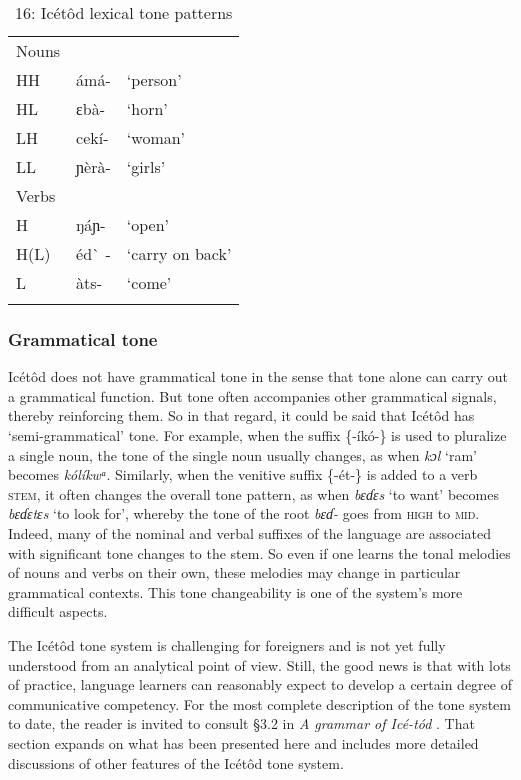 \begin{table}
\caption{16: Icétôd lexical tone patterns}
\label{tab:2}


\begin{tabularx}{\textwidth}{XXX}
\lsptoprule

Nouns &  & \\
HH & ámá- & ‘person’\\
HL & ɛbà- & ‘horn’\\
LH & cekí- & ‘woman’\\
LL & ɲèrà- & ‘girls’\\
Verbs &  & \\
H & ŋáɲ- & ‘open’\\
H(L) & éd\`{} - & ‘carry on back’\\
L & àts- & ‘come’\\
\lspbottomrule
\end{tabularx}
\end{table}

\subsubsection{Grammatical tone}

Icétôd does not have grammatical tone in the sense that tone alone can carry out a grammatical function. But tone often accompanies other grammatical signals, thereby reinforcing them. So in that regard, it could be said that Icétôd has ‘semi-grammatical’ tone. For example, when the suffix \{-íkó-\} is used to pluralize a single noun, the tone of the single noun usually changes, as when \textit{kɔl} ‘ram’ becomes \textit{kólíkwᵃ}. Similarly, when the venitive suffix \{-ét-\} is added to a verb \textsc{stem}, it often changes the overall tone pattern, as when \textit{bɛɗɛs} ‘to want’ becomes \textit{bɛɗɛtɛs} ‘to look for’, whereby the tone of the root \textit{bɛɗ-} goes from \textsc{high} to \textsc{mid}. Indeed, many of the nominal and verbal suffixes of the language are associated with significant tone changes to the stem. So even if one learns the tonal melodies of nouns and verbs on their own, these melodies may change in particular grammatical contexts. This tone changeability is one of the system’s more difficult aspects.

The Icétôd tone system is challenging for foreigners and is not yet fully understood from an analytical point of view. Still, the good news is that with lots of practice, language learners can reasonably expect to develop a certain degree of communicative competency. For the most complete description of the tone system to date, the reader is invited to consult §3.2 in \textit{A grammar of Icé-tód} \citep{Schrock2014}. That section expands on what has been presented here and includes more detailed discussions of other features of the Icétôd tone system.
 
